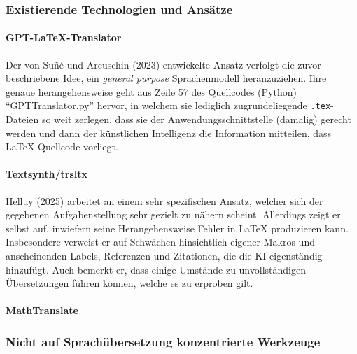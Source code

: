 \subsubsection{Existierende Technologien und Ansätze}
\paragraph*{GPT-LaTeX-Translator}\par
Der von Suñé und Arcuschin (2023) entwickelte Ansatz verfolgt die zuvor beschriebene Idee, ein \textit{general purpose} Sprachenmodell heranzuziehen. Ihre genaue herangehensweise geht aus Zeile 57 des Quellcodes (Python) \enquote{GPTTranslator.py} hervor, in welchem sie lediglich zugrundeliegende \texttt{.tex}-Dateien so weit zerlegen, dass sie der Anwendungsschnittstelle (damalig) gerecht werden und dann der künstlichen Intelligenz die Information mitteilen, dass \LaTeX{}-Quellcode vorliegt.

\paragraph*{Textsynth/trsltx}\par
Helluy (2025) arbeitet an einem sehr spezifischen Ansatz, welcher sich der gegebenen Aufgabenstellung sehr gezielt zu nähern scheint. Allerdings zeigt er selbst auf, inwiefern seine Herangehensweise Fehler in \LaTeX{} produzieren kann. Insbesondere verweist er auf Schwächen hinsichtlich eigener Makros und anscheinenden Labels, Referenzen und Zitationen, die die KI eigenständig hinzufügt. Auch bemerkt er, dass einige Umstände zu unvollständigen Übersetzungen führen können, welche es zu erproben gilt.

\paragraph*{MathTranslate}\par

\subsubsection{Nicht auf Sprachübersetzung konzentrierte Werkzeuge}